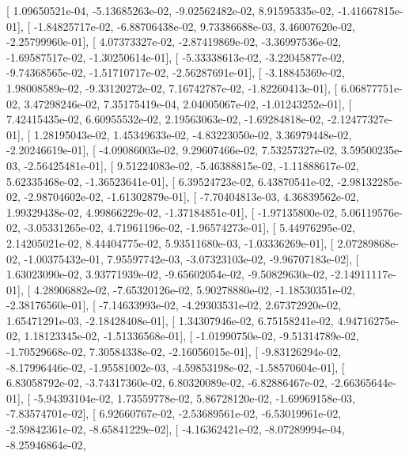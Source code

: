 \documentclass{article}
\begin{document}
       [  1.09650521e-04,  -5.13685263e-02,  -9.02562482e-02,
          8.91595335e-02,  -1.41667815e-01],
       [ -1.84825717e-02,  -6.88706438e-02,   9.73386688e-03,
          3.46007620e-02,  -2.25799960e-01],
       [  4.07373327e-02,  -2.87419869e-02,  -3.36997536e-02,
         -1.69587517e-02,  -1.30250614e-01],
       [ -5.33338613e-02,  -3.22045877e-02,  -9.74368565e-02,
         -1.51710717e-02,  -2.56287691e-01],
       [ -3.18845369e-02,   1.98008589e-02,  -9.33120272e-02,
          7.16742787e-02,  -1.82260413e-01],
       [  6.06877751e-02,   3.47298246e-02,   7.35175419e-04,
          2.04005067e-02,  -1.01243252e-01],
       [  7.42415435e-02,   6.60955532e-02,   2.19563063e-02,
         -1.69284818e-02,  -2.12477327e-01],
       [  1.28195043e-02,   1.45349633e-02,  -4.83223050e-02,
          3.36979448e-02,  -2.20246619e-01],
       [ -4.09086003e-02,   9.29607466e-02,   7.53257327e-02,
          3.59500235e-03,  -2.56425481e-01],
       [  9.51224083e-02,  -5.46388815e-02,  -1.11888617e-02,
          5.62335468e-02,  -1.36523641e-01],
       [  6.39524723e-02,   6.43870541e-02,  -2.98132285e-02,
         -2.98704602e-02,  -1.61302879e-01],
       [ -7.70404813e-03,   4.36839562e-02,   1.99329438e-02,
          4.99866229e-02,  -1.37184851e-01],
       [ -1.97135800e-02,   5.06119576e-02,  -3.05331265e-02,
          4.71961196e-02,  -1.96574273e-01],
       [  5.44976295e-02,   2.14205021e-02,   8.44404775e-02,
          5.93511680e-03,  -1.03336269e-01],
       [  2.07289868e-02,  -1.00375432e-01,   7.95597742e-03,
         -3.07323103e-02,  -9.96707183e-02],
       [  1.63023090e-02,   3.93771939e-02,  -9.65602054e-02,
         -9.50829630e-02,  -2.14911117e-01],
       [  4.28906882e-02,  -7.65320126e-02,   5.90278880e-02,
         -1.18530351e-02,  -2.38176560e-01],
       [ -7.14633993e-02,  -4.29303531e-02,   2.67372920e-02,
          1.65471291e-03,  -2.18428408e-01],
       [  1.34307946e-02,   6.75158241e-02,   4.94716275e-02,
          1.18123345e-02,  -1.51336568e-01],
       [ -1.01990750e-02,  -9.51314789e-02,  -1.70529668e-02,
          7.30584338e-02,  -2.16056015e-01],
       [ -9.83126294e-02,  -8.17996446e-02,  -1.95581002e-03,
         -4.59853198e-02,  -1.58570604e-01],
       [  6.83058792e-02,  -3.74317360e-02,   6.80320089e-02,
         -6.82886467e-02,  -2.66365644e-01],
       [ -5.94393104e-02,   1.73559778e-02,   5.86728120e-02,
         -1.69969158e-03,  -7.83574701e-02],
       [  6.92660767e-02,  -2.53689561e-02,  -6.53019961e-02,
         -2.59842361e-02,  -8.65841229e-02],
       [ -4.16362421e-02,  -8.07289994e-04,  -8.25946864e-02,
\end{document}
